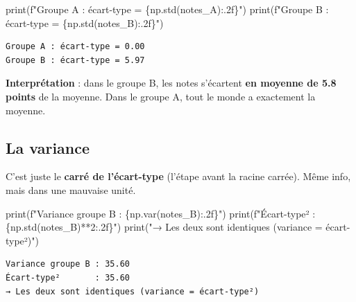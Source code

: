 \documentclass[
  french,
  11pt,
  a4paper,
]{scrbook}
\newenvironment{Shaded}{}{}
\newcommand{\BuiltInTok}[1]{\textcolor[rgb]{0.84,0.23,0.29}{#1}}
\newcommand{\DecValTok}[1]{\textcolor[rgb]{0.00,0.36,0.77}{#1}}
\newcommand{\NormalTok}[1]{\textcolor[rgb]{0.14,0.16,0.18}{#1}}
\newcommand{\OperatorTok}[1]{\textcolor[rgb]{0.14,0.16,0.18}{#1}}
\newcommand{\SpecialCharTok}[1]{\textcolor[rgb]{0.00,0.36,0.77}{#1}}
\newcommand{\SpecialStringTok}[1]{\textcolor[rgb]{0.01,0.18,0.38}{#1}}
\newcommand{\StringTok}[1]{\textcolor[rgb]{0.01,0.18,0.38}{#1}}
\begin{document}
\begin{Shaded}
\begin{Highlighting}[]
\BuiltInTok{print}\NormalTok{(}\SpecialStringTok{f"Groupe A : écart{-}type = }\SpecialCharTok{\{}\NormalTok{np}\SpecialCharTok{.}\NormalTok{std(notes\_A)}\SpecialCharTok{:.2f\}}\SpecialStringTok{"}\NormalTok{)}
\BuiltInTok{print}\NormalTok{(}\SpecialStringTok{f"Groupe B : écart{-}type = }\SpecialCharTok{\{}\NormalTok{np}\SpecialCharTok{.}\NormalTok{std(notes\_B)}\SpecialCharTok{:.2f\}}\SpecialStringTok{"}\NormalTok{)}
\end{Highlighting}
\end{Shaded}

\begin{verbatim}
Groupe A : écart-type = 0.00
Groupe B : écart-type = 5.97
\end{verbatim}

\textbf{Interprétation} : dans le groupe B, les notes s'écartent
\textbf{en moyenne de 5.8 points} de la moyenne. Dans le groupe A, tout
le monde a exactement la moyenne.

\subsection{La variance}\label{la-variance}

C'est juste le \textbf{carré de l'écart-type} (l'étape avant la racine
carrée). Même info, mais dans une mauvaise unité.

\begin{Shaded}
\begin{Highlighting}[]
\BuiltInTok{print}\NormalTok{(}\SpecialStringTok{f"Variance groupe B : }\SpecialCharTok{\{}\NormalTok{np}\SpecialCharTok{.}\NormalTok{var(notes\_B)}\SpecialCharTok{:.2f\}}\SpecialStringTok{"}\NormalTok{)}
\BuiltInTok{print}\NormalTok{(}\SpecialStringTok{f"Écart{-}type²       : }\SpecialCharTok{\{}\NormalTok{np}\SpecialCharTok{.}\NormalTok{std(notes\_B)}\OperatorTok{**}\DecValTok{2}\SpecialCharTok{:.2f\}}\SpecialStringTok{"}\NormalTok{)}
\BuiltInTok{print}\NormalTok{(}\StringTok{"→ Les deux sont identiques (variance = écart{-}type²)"}\NormalTok{)}
\end{Highlighting}
\end{Shaded}

\begin{verbatim}
Variance groupe B : 35.60
Écart-type²       : 35.60
→ Les deux sont identiques (variance = écart-type²)
\end{verbatim}
\end{document}
